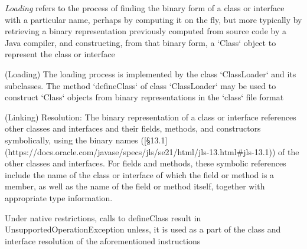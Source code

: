 \textit{Loading} refers to the process of finding the binary form of a class or interface with a particular name, perhaps by computing it on the fly, but more typically by retrieving a binary representation previously computed from source code by a Java compiler, and constructing, from that binary form, a `Class` object to represent the class or interface

(Loading) The loading process is implemented by the class `ClassLoader` and its subclasses. The method `defineClass` of class `ClassLoader` may be used to construct `Class` objects from binary representations in the `class` file format

(Linking) Resolution: The binary representation of a class or interface references other classes and interfaces and their fields, methods, and constructors symbolically, using the binary names ([§13.1](https://docs.oracle.com/javase/specs/jls/se21/html/jls-13.html\#jls-13.1)) of the other classes and interfaces. For fields and methods, these symbolic references include the name of the class or interface of which the field or method is a member, as well as the name of the field or method itself, together with appropriate type information.

Under native restrictions, calls to defineClass result in UnsupportedOperationException unless, it is used as a part of the class and interface resolution of the aforementioned instructions

